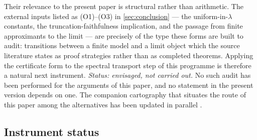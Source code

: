 \documentclass[12pt,a4paper]{article}
\theoremstyle{definition}
\theoremstyle{remark}
\begin{document}
Their relevance to the present paper is structural rather than
arithmetic.  The external inputs listed as (O1)--(O3) in
\cref{sec:conclusion} --- the uniform-in-$\lambda$ constants, the
truncation-faithfulness implication, and the passage from finite
approximants to the limit --- are precisely of the type these forms are
built to audit: transitions between a finite model and a limit object
which the source literature states as proof strategies rather than as
completed theorems.  Applying the certificate form to the spectral
transport step of this programme is therefore a natural next
instrument.  \emph{Status: envisaged, not carried out.}  No such audit
has been performed for the arguments of this paper, and no statement in
the present version depends on one.  The companion cartography that
situates the route of this paper among the alternatives has been
updated in parallel \cite{Geiger2026atlas}.

\subsection{Instrument status}
\end{document}
